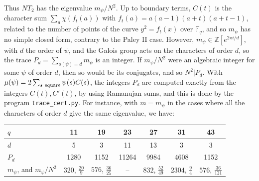 \documentclass[11pt]{amsart}
\begin{document}
Thus $NT_2$ has the eigenvalue $m_\psi/N^2$. Up to boundary terms, $C(t)$ is the character sum $\sum_a\chi(f_t(a))$ with $f_t(a)=a(a-1)(a+t)(a+t-1)$, related to the number of points of the curve $y^2=f_t(x)$ over $\mathbb F_q$, and so $m_\psi$ has no simple closed form, contrary to the Paley II case. However, $m_\psi\in\mathbb Z[e^{2\pi i/d}]$, with $d$ the order of $\psi$, and the Galois group acts on the characters of order $d$, so the trace $P_d=\sum_{o(\psi)=d}m_\psi$ is an integer. If $m_\psi/N^2$ were an algebraic integer for some $\psi$ of order $d$, then so would be its conjugates, and so $N^2|P_d$. With $\mu(\psi)=2\sum_{s\ {\rm square}}\psi(s)C(s)$, the integers $P_d$ are computed exactly from the integers $C(t),C'(t)$, by using Ramanujan sums, and this is done by the program \texttt{trace\_cert.py}. For instance, with $m=m_\psi$ in the cases where all the characters of order $d$ give the same eigenvalue, we have:

\medskip

\begin{center}
\begin{tabular}{lcccccc}
\toprule
$q$ & 11 & 19 & 23 & 27 & 31 & 43\\
\midrule
$d$ & 5 & 3 & 11 & 13 & 3 & 3\\
$P_d$ & 1280 & 1152 & 11264 & 9984 & 4608 & 1152\\
$m_\psi$, and $m_\psi/N^2$ & $320$, $\frac{20}{9}$ & $576$, $\frac{36}{25}$ & -- & $832$, $\frac{52}{49}$ & $2304$, $\frac{9}{4}$ & $576$, $\frac{36}{121}$\\
\bottomrule
\end{tabular}
\end{center}

\medskip
\end{document}
